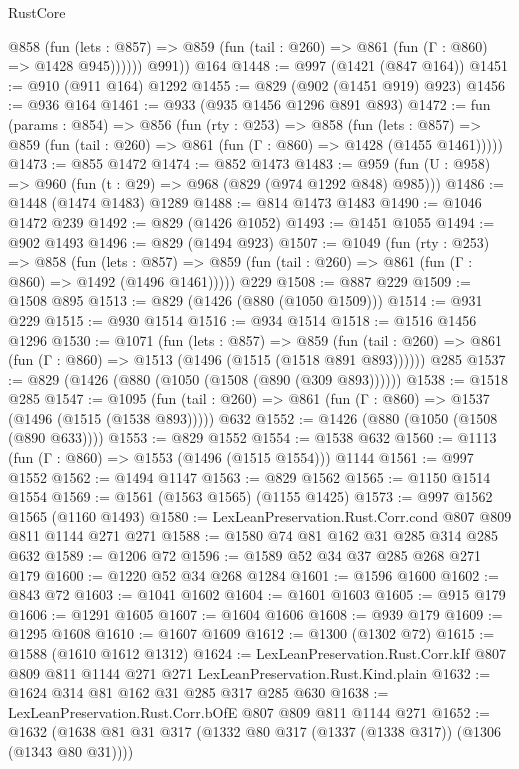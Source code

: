 \begin{lexlean}{RustCore}
\begin{coremodule}
            @858
              (fun (lets : @857) =>
              @859 (fun (tail : @260) => @861 (fun (Γ : @860) => @1428 @945))))))
        @991))
    @164
@1448 := @997 (@1421 (@847 @164))
@1451 := @910 (@911 @164) @1292
@1455 := @829 (@902 (@1451 @919) @923)
@1456 := @936 @164
@1461 := @933 (@935 @1456 @1296 @891 @893)
@1472 := fun (params : @854) =>
  @856
    (fun (rty : @253) =>
    @858
      (fun (lets : @857) =>
      @859 (fun (tail : @260) => @861 (fun (Γ : @860) => @1428 (@1455 @1461)))))
@1473 := @855 @1472
@1474 := @852 @1473
@1483 := @959 (fun (U : @958) => @960 (fun (t : @29) => @968 (@829 (@974 @1292 @848) @985)))
@1486 := @1448 (@1474 @1483) @1289
@1488 := @814 @1473 @1483
@1490 := @1046 @1472 @239
@1492 := @829 (@1426 @1052)
@1493 := @1451 @1055
@1494 := @902 @1493
@1496 := @829 (@1494 @923)
@1507 := @1049
    (fun (rty : @253) =>
    @858
      (fun (lets : @857) =>
      @859 (fun (tail : @260) => @861 (fun (Γ : @860) => @1492 (@1496 @1461)))))
    @229
@1508 := @887 @229
@1509 := @1508 @895
@1513 := @829 (@1426 (@880 (@1050 @1509)))
@1514 := @931 @229
@1515 := @930 @1514
@1516 := @934 @1514
@1518 := @1516 @1456 @1296
@1530 := @1071
    (fun (lets : @857) =>
    @859 (fun (tail : @260) => @861 (fun (Γ : @860) => @1513 (@1496 (@1515 (@1518 @891 @893))))))
    @285
@1537 := @829 (@1426 (@880 (@1050 (@1508 (@890 (@309 @893))))))
@1538 := @1518 @285
@1547 := @1095
    (fun (tail : @260) => @861 (fun (Γ : @860) => @1537 (@1496 (@1515 (@1538 @893)))))
    @632
@1552 := @1426 (@880 (@1050 (@1508 (@890 @633))))
@1553 := @829 @1552
@1554 := @1538 @632
@1560 := @1113 (fun (Γ : @860) => @1553 (@1496 (@1515 @1554))) @1144
@1561 := @997 @1552
@1562 := @1494 @1147
@1563 := @829 @1562
@1565 := @1150 @1514 @1554
@1569 := @1561 (@1563 @1565) (@1155 @1425)
@1573 := @997 @1562 @1565 (@1160 @1493)
@1580 := LexLeanPreservation.Rust.Corr.cond @807 @809 @811 @1144 @271 @271
@1588 := @1580 @74 @81 @162 @31 @285 @314 @285 @632
@1589 := @1206 @72
@1596 := @1589 @52 @34 @37 @285 @268 @271 @179
@1600 := @1220 @52 @34 @268 @1284
@1601 := @1596 @1600
@1602 := @843 @72
@1603 := @1041 @1602
@1604 := @1601 @1603
@1605 := @915 @179
@1606 := @1291 @1605
@1607 := @1604 @1606
@1608 := @939 @179
@1609 := @1295 @1608
@1610 := @1607 @1609
@1612 := @1300 (@1302 @72)
@1615 := @1588 (@1610 @1612 @1312)
@1624 := LexLeanPreservation.Rust.Corr.kIf
    @807
    @809
    @811
    @1144
    @271
    @271
    LexLeanPreservation.Rust.Kind.plain
@1632 := @1624 @314 @81 @162 @31 @285 @317 @285 @630
@1638 := LexLeanPreservation.Rust.Corr.bOfE @807 @809 @811 @1144 @271
@1652 := @1632 (@1638 @81 @31 @317 (@1332 @80 @317 (@1337 (@1338 @317)) (@1306 (@1343 @80 @31))))

\end{coremodule}
\end{lexlean}
